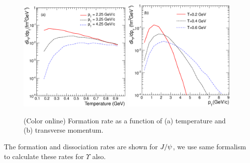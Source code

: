 \documentclass[aps,prc,preprint,superscriptaddress,showpacs,showkeys]{revtex4-1}
\begin{document}
\begin{figure}
\includegraphics[width=0.49\textwidth]{Figures/Fig4a_FRateVsT.eps}
\includegraphics[width=0.49\textwidth]{Figures/Fig4b_FRateVsPt.eps}
\caption{(Color online) Formation rate as a function of (a) temperature and (b) transverse momentum.}
\label{fig:ForRateVsTempAndPt}
\end{figure}

The formation and dissociation rates are shown for $J/\psi$, we use same formalism to calculate
these rates for $\Upsilon$ also.
\end{document}
